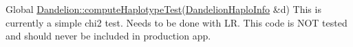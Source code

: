 \label{deprecated__deprecated000001}
\hypertarget{deprecated__deprecated000001}{}
 
\begin{DoxyDescription}
\item[Global \hyperlink{classDandelion_a7d005ed3065f6d59bcdb569ac60a80d1}{Dandelion::computeHaplotypeTest}(\hyperlink{structDandelionHaploInfo}{DandelionHaploInfo} \&d) ]This is currently a simple chi2 test. Needs to be done with LR. This code is NOT tested and should never be included in production app.


\end{DoxyDescription}